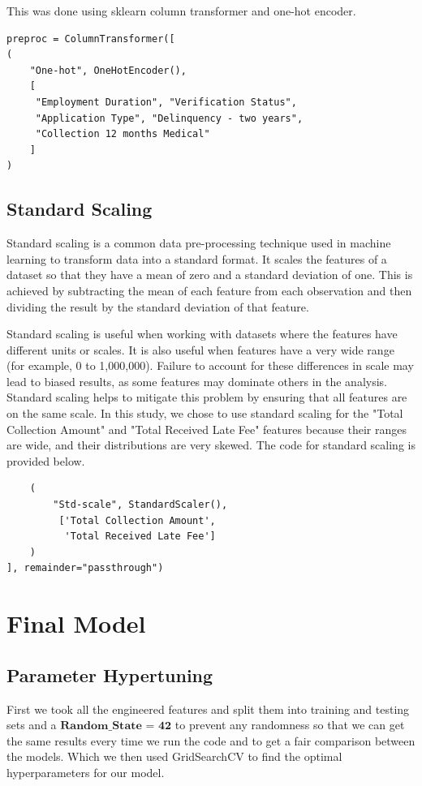 \documentclass[sigplan]{acmart}
\begin{document}
This was done using sklearn column transformer and one-hot encoder.
\begin{verbatim}
preproc = ColumnTransformer([
(
    "One-hot", OneHotEncoder(), 
    [
     "Employment Duration", "Verification Status", 
     "Application Type", "Delinquency - two years", 
     "Collection 12 months Medical"
    ]
)
\end{verbatim}


\subsection{Standard Scaling}
Standard scaling is a common data pre-processing technique used in machine learning to transform data into a standard format. It scales the features of a dataset so that they have a mean of zero and a standard deviation of one. This is achieved by subtracting the mean of each feature from each observation and then dividing the result by the standard deviation of that feature.

Standard scaling is useful when working with datasets where the features have different units or scales. It is also useful when features have a very wide range (for example, 0 to 1,000,000). Failure to account for these differences in scale may lead to biased results, as some features may dominate others in the analysis. Standard scaling helps to mitigate this problem by ensuring that all features are on the same scale. In this study, we chose to use standard scaling for the "Total Collection Amount" and "Total Received Late Fee" features because their ranges are wide, and their distributions are very skewed. The code for standard scaling is provided below.
\begin{verbatim}
    (
        "Std-scale", StandardScaler(),
         ['Total Collection Amount',
          'Total Received Late Fee']
    )
], remainder="passthrough")
\end{verbatim}

\section{Final Model}
\subsection{Parameter Hypertuning}
First we took all the engineered features  and split them into training and testing sets and a $\textbf{Random\_State = 42}$ to prevent any randomness so
that we can get the same results every time we run the code and to get a fair comparison between the models. Which we then used GridSearchCV to find the optimal hyperparameters for our model.
\end{document}
